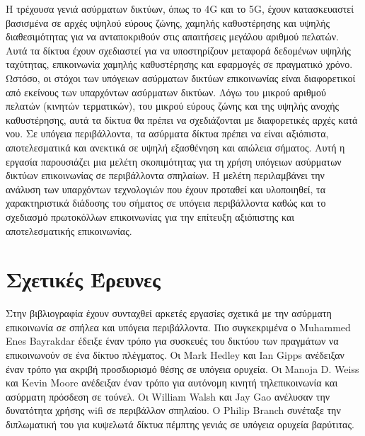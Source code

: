 \documentclass[12pt]{article}
\begin{document}
\begin{multicols}{2}
        Η τρέχουσα γενιά ασύρματων δικτύων, όπως το 4G και
        το 5G, έχουν κατασκευαστεί βασισμένα σε αρχές υψηλού
        εύρους ζώνης, χαμηλής καθυστέρησης και υψηλής
        διαθεσιμότητας για να ανταποκριθούν στις απαιτήσεις
        μεγάλου αριθμού πελατών. Αυτά τα δίκτυα έχουν
        σχεδιαστεί για να υποστηρίζουν μεταφορά δεδομένων
        υψηλής ταχύτητας, επικοινωνία χαμηλής καθυστέρησης
        και εφαρμογές σε πραγματικό χρόνο.
        Ωστόσο, οι στόχοι των υπόγειων ασύρματων δικτύων
        επικοινωνίας είναι διαφορετικοί από εκείνους των
        υπαρχόντων ασύρματων δικτύων. Λόγω του μικρού
        αριθμού πελατών (κινητών τερματικών), του μικρού
        εύρους ζώνης και της
        υψηλής ανοχής καθυστέρησης, αυτά τα δίκτυα θα πρέπει
        να σχεδιάζονται με διαφορετικές αρχές κατά νου. Σε
        υπόγεια περιβάλλοντα, τα ασύρματα δίκτυα πρέπει να
        είναι αξιόπιστα, αποτελεσματικά και ανεκτικά σε
        υψηλή εξασθένηση και απώλεια σήματος.
        Αυτή η εργασία παρουσιάζει μια μελέτη σκοπιμότητας
        για τη χρήση υπόγειων ασύρματων δικτύων επικοινωνίας
        σε περιβάλλοντα σπηλαίων. Η μελέτη περιλαμβάνει την
        ανάλυση των υπαρχόντων τεχνολογιών που έχουν
        προταθεί και υλοποιηθεί, τα χαρακτηριστικά διάδοσης
        του σήματος σε υπόγεια περιβάλλοντα καθώς και το
        σχεδιασμό πρωτοκόλλων επικοινωνίας για την επίτευξη
        αξιόπιστης και αποτελεσματικής επικοινωνίας.

    \section{\normalsize \textsf{Σχετικές Έρευνες}} 
            Στην βιβλιογραφία έχουν συνταχθεί αρκετές
        εργασίες σχετικά με την ασύρματη επικοινωνία σε
        σπήλεα και υπόγεια περιβάλλοντα. Πιο συγκεκριμένα ο
        Muhammed Enes Bayrakdar έδειξε έναν τρόπο για
        συσκευές του δικτύου των πραγμάτων να επικοινωνούν
        σε ένα δίκτυο πλέγματος. Οι Mark Hedley και Ian
        Gipps ανέδειξαν έναν τρόπο για ακριβή προσδιορισμό
        θέσης σε υπόγεια ορυχεία. Οι Manoja D. Weiss και
        Kevin Moore ανέδειξαν έναν τρόπο για αυτόνομη κινητή
        τηλεπικοινωνία και ασύρματη πρόσδεση σε τούνελ. Οι
        William Walsh και Jay Gao ανέλυσαν την δυνατότητα
        χρήσης wifi σε περιβάλλον σπηλαίου. Ο Philip Branch
        συνέταξε την διπλωματική του για κυψελωτά δίκτυα
        πέμπτης γενιάς σε υπόγεια ορυχεία βαρύτιτας.


\end{multicols}
\end{document}
